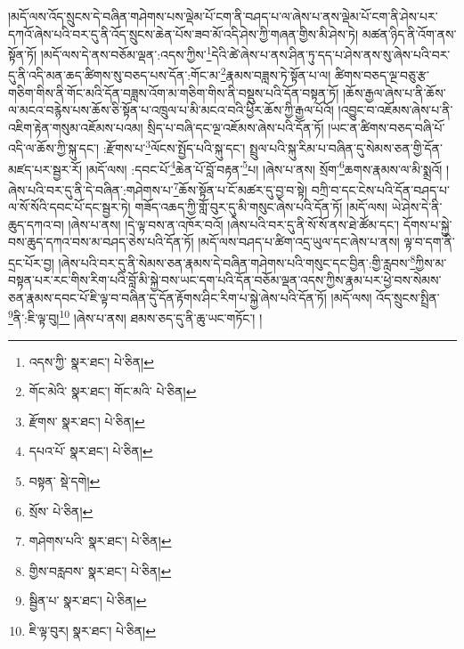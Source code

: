 །མདོ་ལས་འོད་སྲུངས་དེ་བཞིན་གཤེགས་པས་ལྡེམ་པོ་ངག་ནི་བཤད་པ་ལ་ཞེས་པ་ནས་ལྡེམ་པོ་ངག་ནི་ཤེས་པར་དཀའོ་ཞེས་པའི་བར་དུ་ནི་འོད་སྲུངས་ཆེན་པོས་ཟབ་མོ་འདི་ཤེས་ཀྱི་གཞན་གྱིས་མི་ཤེས་ཏེ། མཚན་ཉིད་ནི་འོག་ནས་སྟོན་ཏོ། །མདོ་ལས་དེ་ནས་བཅོམ་ལྡན་:འདས་ཀྱིས་\footnote{འདས་ཀྱི་  སྣར་ཐང་།  པེ་ཅིན། }དེའི་ཚེ་ཞེས་པ་ནས་ཤིན་ཏུ་དད་པ་ཤེས་ནས་སུ་ཞེས་པའི་བར་དུ་ནི་འདི་མན་ཆད་ཚིགས་སུ་བཅད་པས་དོན་:གོང་མ་\footnote{གོང་མེའི་  སྣར་ཐང་། གོང་མའི་  པེ་ཅིན། }རྣམས་བཟླས་ཏེ་སྟོན་པ་ལ། ཚིགས་བཅད་ལྔ་བཅུ་རྩ་གཅིག་གིས་ནི་གོང་མའི་དོན་བཟླས་འོག་མ་གཅིག་གིས་ནི་བསྡུས་པའི་དོན་བསྟན་ཏོ། །ཆོས་རྒྱལ་ཞེས་པ་ནི་ཆོས་ལ་མངའ་བརྙེས་པས་ཆོས་ཅི་སྟོན་པ་འཁྲུལ་པ་མི་མངའ་བའི་ཕྱིར་ཆོས་ཀྱི་རྒྱལ་པོའོ། །འབྱུང་བ་འཇོམས་ཞེས་པ་ནི་འཇིག་རྟེན་གསུམ་འཇོམས་པའམ། སྲིད་པ་བཞི་དང་ལྔ་འཇོམས་ཞེས་པའི་དོན་ཏོ། །ཡང་ན་ཚིགས་བཅད་བཞི་པོ་འདི་ལ་ཆོས་ཀྱི་སྐུ་དང་། :རྫོགས་པ་\footnote{རྫོགས་  སྣར་ཐང་།  པེ་ཅིན། }ལོངས་སྤྱོད་པའི་སྐུ་དང་། སྤྲུལ་པའི་སྐུ་རིམ་པ་བཞིན་དུ་སེམས་ཅན་གྱི་དོན་མཛད་པར་སྦྱར་རོ། །མདོ་ལས། :དབང་པོ་\footnote{དཔའ་པོ་  སྣར་ཐང་།  པེ་ཅིན། }ཆེན་པོ་བློ་བརྟན་\footnote{བསྟན་  སྡེ་དགེ། }པ། །ཞེས་པ་ནས། སྲོག་\footnote{སྲོས་  པེ་ཅིན། }ཆགས་རྣམས་ལ་མི་སྨྲའོ། །ཞེས་པའི་བར་དུ་ནི་དེ་བཞིན་:གཤེགས་པ་\footnote{གཤེགས་པའི་  སྣར་ཐང་།  པེ་ཅིན། }ཆོས་སྟོན་པ་ངོ་མཚར་དུ་བྱ་བ་སྟེ། བཀྲི་བ་དང་ངེས་པའི་དོན་བཤད་པ་ལ་སོ་སོའི་དབང་པོ་དང་སྦྱར་ཏེ། གཟོད་འཆད་ཀྱི་གློ་བུར་དུ་མི་གསུང་ཞེས་པའི་དོན་ཏོ། །མདོ་ལས། ཡེ་ཤེས་དེ་ནི་ཆུད་དཀའ་བ། །ཞེས་པ་ནས། །དེ་ལྟ་བས་ན་འཁོར་བའོ། །ཞེས་པའི་བར་དུ་ནི་སོ་སོ་ནས་ཐེ་ཚོམ་དང་། དོགས་པ་སྐྱེ་བས་ཆུད་དཀའ་བས་མ་བཤད་ཅེས་པའི་དོན་ཏོ། །མདོ་ལས་བཤད་པ་ཚིག་འདྲ་ཡུལ་དང་ཞེས་པ་ནས། ལྟ་བ་དག་ནི་དྲང་པོར་བྱ། །ཞེས་པའི་བར་དུ་ནི་སེམས་ཅན་རྣམས་དེ་བཞིན་གཤེགས་པའི་གསུང་དང་བྱིན་:གྱི་རླབས་\footnote{གྱིས་བརླབས་  སྣར་ཐང་།  པེ་ཅིན། }ཀྱིས་མ་བསྟན་པར་རང་གིས་རིག་པའི་བློ་མི་སྐྱེ་བས་ཡང་དག་པའི་དོན་བཅོམ་ལྡན་འདས་ཀྱིས་རྣམ་པར་ཕྱེ་བས་སེམས་ཅན་རྣམས་དབང་པོ་ཇི་ལྟ་བ་བཞིན་དུ་དོན་རྟོགས་ཤིང་རིག་པ་སྐྱེ་ཞེས་པའི་དོན་ཏོ། །མདོ་ལས། འོད་སྲུངས་སྤྲིན་\footnote{སྦྱིན་པ་  སྣར་ཐང་།  པེ་ཅིན། }ནི་:ཇི་ལྟ་བུ།\footnote{ཇི་ལྟ་བུར།  སྣར་ཐང་།  པེ་ཅིན། } །ཞེས་པ་ནས། ཐམས་ཅད་དུ་ནི་ཆུ་ཡང་གཏོང་། །
